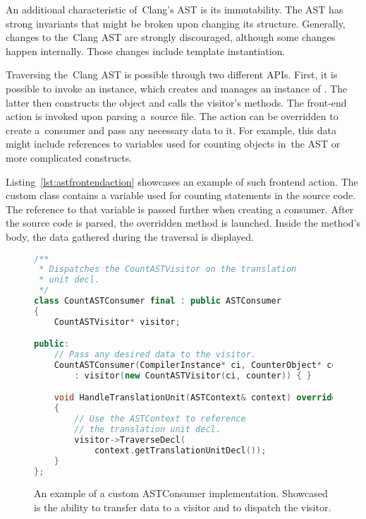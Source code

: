 An additional characteristic of~Clang's AST is its immutability. 
The AST has strong invariants that might be broken upon changing 
its structure. 
Generally, changes to the~Clang AST are strongly discouraged, 
although some changes happen internally. 
Those changes include template instantiation.

Traversing the~Clang AST is possible through two different APIs. 
First, it is possible to invoke an  instance, 
which creates and manages an instance of . 
The latter then constructs the  object and 
calls the visitor's methods. 
The front-end action is invoked upon parsing a~source file. 
The action can be overridden to create a~consumer and pass any necessary 
data to it. 
For example, this data might include references to variables used for 
counting objects in~the AST or more complicated constructs. 

Listing~\ref{lst:astfrontendaction} showcases an example of such frontend 
action. 
The custom class contains a variable used for counting statements 
in the source code. 
The reference to that variable is passed further when creating a consumer. 
After the source code is parsed, the overridden  
method is launched. 
Inside the method's body, the data gathered during the traversal is 
displayed.

\begin{figure}[H]\centering
\begin{lstlisting}[language=C++]
/**
 * Dispatches the CountASTVisitor on the translation 
 * unit decl.
 */
class CountASTConsumer final : public ASTConsumer
{
	CountASTVisitor* visitor;

public:
	// Pass any desired data to the visitor.
	CountASTConsumer(CompilerInstance* ci, CounterObject* counter)
		: visitor(new CountASTVisitor(ci, counter)) { }

	void HandleTranslationUnit(ASTContext& context) override
	{
		// Use the ASTContext to reference 
		// the translation unit decl.
		visitor->TraverseDecl(
			context.getTranslationUnitDecl());
	}
};
\end{lstlisting}
\caption{An example of a custom ASTConsumer implementation.
Showcased is the ability to transfer data to a visitor and
to dispatch the visitor.}
\label{lst:astconsumer}
\end{figure}


